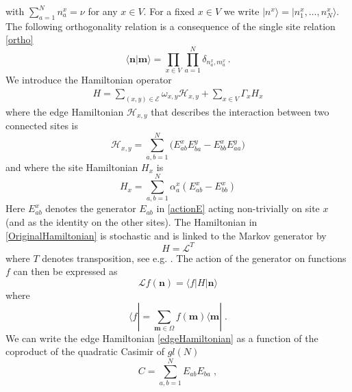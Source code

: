 \documentclass[10pt]{article}
\numberwithin{equation}{section}
\numberwithin{equation}{subsection}
\newcommand{\co}{\;,}
\newcommand{\dt}{\;.}
\begin{document}
with $\sum_{a=1}^{N}n_{a}^{x}=\nu$ for any $x\in V$. For a fixed $x\in V$ we write $|n^{x}\rangle=|n_{1}^{x},\ldots,n_{N}^{x}\rangle$. The following orthogonality relation is a consequence of the single site relation \eqref{ortho}
\begin{equation}
    \langle {\bm{n}}|{\bm{m}}\rangle =\prod_{x\in V}\prod_{a=1}^N\delta_{n^x_a,m^{x}_a}\,.
\end{equation}
We introduce the Hamiltonian operator
\begin{equation}\label{OriginalHamiltonian}
	\begin{split}
		H=\sum_{(x,y)\in \mathcal{E}}\omega_{x,y}\mathcal{H}_{x,y}+\sum_{x\in V}\Gamma_{x}H_{x}
	\end{split}
\end{equation}
where the edge Hamiltonian $\mathcal{H}_{x,y}$ that describes the interaction between two connected sites is
\begin{equation}\label{edgeHamiltonian}
\mathcal{H}_{x,y}=\sum_{a,b=1}^{N}\Big(E_{ab}^{x} E_{b a}^{y}-E_{bb}^{x} E_{aa}^{y}\Big)
 \end{equation}
  and where the site Hamiltonian $H_{x}$  is
 \begin{equation}\label{siteHamiltonian}
H_{x}=\sum_{a,b=1}^{N}\alpha_{a}^{x}\left(E_{ab}^{x}-E_{bb}^{x}\right)
\end{equation}
Here $E_{ab}^{x}$ denotes the generator $E_{ab}$ in \eqref{actionE} acting non-trivially on site $x$ (and as the identity on the other sites). 
The Hamiltonian in \eqref{OriginalHamiltonian} is stochastic and is linked to the Markov generator  by
\begin{equation}\label{Hamiltonian-Generator}
H=\mathcal{L}^{T} 
\end{equation}
where $T$ denotes transposition, see e.g.  \cite{belitsky2015self}.
The action of the generator on functions $f$ can then  be expressed as 
\begin{equation}
    \mathcal{L}f( {\bm{n}})=\langle f|H| {\bm{n}}\rangle
\end{equation}
where 
\begin{equation}
    \langle f|=\sum_{ {{\bm{m}}\in \Omega}}f( {\bm{m}})\langle  {\bm{m}}|\dt
\end{equation}
We can write the edge Hamiltonian \eqref{edgeHamiltonian} as a function of the coproduct of the quadratic Casimir of ${gl}(N)$
\begin{equation}\label{secondCasimir}
    C=\sum_{a,b=1}^{N}E_{ab}E_{ba}\co
\end{equation}
\end{document}
